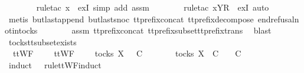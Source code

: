 \begin{isabellebody}
\ \ \ \ \ \ \isamarkupfalse%
\ {\isacharparenleft}rule{\isacharunderscore}tac\ x{\isacharequal}{\isachardoublequoteopen}{\isasymrho}{\isacharprime}{\isachardoublequoteclose}\ \ exI{\isacharcomma}\ simp\ add{\isacharcolon}\ assm{}{\isacharparenright}\isanewline
\ \ \ \ \ \ \isamarkupfalse%
\ {\isacharparenleft}rule{\isacharunderscore}tac\ x{\isacharequal}{\isachardoublequoteopen}{\isacharbrackleft}{\isacharbrackleft}Y{\isacharbrackright}\isactrlsub R{\isacharbrackright}{\isachardoublequoteclose}\ \ exI{\isacharcomma}\ auto{\isacharparenright}\isanewline
\ \ \ \ \ \ \isamarkupfalse%
\ {\isacharparenleft}metis\ butlast{\isacharunderscore}append\ butlast{\isacharunderscore}snoc\ tt{\isacharunderscore}prefix{\isacharunderscore}concat\ tt{\isacharunderscore}prefix{\isacharunderscore}decompose\ end{\isacharunderscore}refusal{\isacharunderscore}notin{\isacharunderscore}tocks{\isacharparenright}\isanewline
\ \ \ \ \ \ \isamarkupfalse%
\ assm{}\ tt{\isacharunderscore}prefix{\isacharunderscore}concat\ tt{\isacharunderscore}prefix{\isacharunderscore}subset{\isacharunderscore}tt{\isacharunderscore}prefix{\isacharunderscore}trans\ \isamarkupfalse%
\ blast\isanewline
\ \ \isamarkupfalse%
\isanewline
{}\isamarkupfalse%
%
\endisatagproof
{\isafoldproof}%
%
\isadelimproof
\isanewline
%
\endisadelimproof
\isanewline
{}\isamarkupfalse%
\ tocks{\isacharunderscore}tt{\isacharunderscore}subset{\isacharunderscore}exists{\isacharcolon}\isanewline
\ \ {\isachardoublequoteopen}ttWF\ {\isacharparenleft}{\isasymrho}\ {\isacharat}\ {\isasymsigma}{\isacharparenright}\ {\isasymLongrightarrow}\ ttWF\ {\isasymsigma}{\isacharprime}\ {\isasymLongrightarrow}\ {\isasymrho}\ {\isasymin}\ tocks\ X\ {\isasymand}\ {\isasymsigma}{\isacharprime}\ {\isasymsubseteq}\isactrlsub C\ {\isasymrho}\ {\isacharat}\ {\isasymsigma}\ {\isasymLongrightarrow}\ {\isasymexists}\ {\isasymrho}{\isacharprime}\ {\isasymin}\ tocks\ X{\isachardot}\ {\isasymrho}{\isacharprime}\ {\isasymsubseteq}\isactrlsub C\ {\isasymrho}\ {\isasymand}\ {\isasymrho}{\isacharprime}\ {\isasymle}\isactrlsub C\ {\isasymsigma}{\isacharprime}{\isachardoublequoteclose}\isanewline
%
\isadelimproof
\ \ %
\endisadelimproof
%
\isatagproof
{}\isamarkupfalse%
\ {\isacharparenleft}induct\ {\isasymsigma}{\isacharprime}\ {\isasymrho}\ rule{\isacharcolon}ttWF{}{\isachardot}induct{\isacharparenright}\isanewline
\ \ \isamarkupfalse%

\end{isabellebody}
